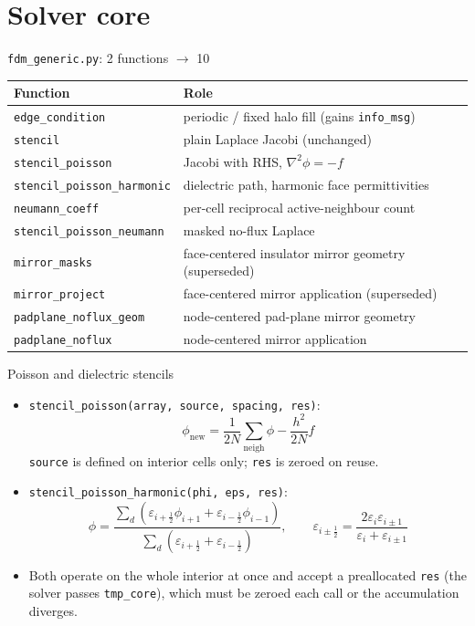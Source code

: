 \documentclass[10pt,aspectratio=169]{beamer}
\newcommand{\ti}[1]{\texttt{\footnotesize #1}}
\begin{document}
\section{Solver core}

\begin{frame}{\texttt{fdm\_generic.py}: 2 functions $\rightarrow$ 10}
  \small
  \begin{center}
  \begin{tabular}{ll}
    \toprule
    Function & Role \\
    \midrule
    \ti{edge\_condition} & periodic / fixed halo fill (gains \ti{info\_msg}) \\
    \ti{stencil} & plain Laplace Jacobi (unchanged) \\
    \ti{stencil\_poisson} & Jacobi with RHS, $\nabla^2\phi=-f$ \\
    \ti{stencil\_poisson\_harmonic} & dielectric path, harmonic face permittivities \\
    \ti{neumann\_coeff} & per-cell reciprocal active-neighbour count \\
    \ti{stencil\_poisson\_neumann} & masked no-flux Laplace \\
    \ti{mirror\_masks} & face-centered insulator mirror geometry (superseded) \\
    \ti{mirror\_project} & face-centered mirror application (superseded) \\
    \ti{padplane\_noflux\_geom} & node-centered pad-plane mirror geometry \\
    \ti{padplane\_noflux} & node-centered mirror application \\
    \bottomrule
  \end{tabular}
  \end{center}
\end{frame}

\begin{frame}{Poisson and dielectric stencils}
  \begin{itemize}\small
  \item \ti{stencil\_poisson(array, source, spacing, res)}:
        \[\phi_{\text{new}}=\frac{1}{2N}\sum_{\text{neigh}}\phi-\frac{h^2}{2N}f\]
        \ti{source} is defined on interior cells only; \ti{res} is zeroed on reuse.
  \item \ti{stencil\_poisson\_harmonic(phi, eps, res)}:
        \[\phi=\frac{\sum_d\left(\varepsilon_{i+\frac12}\phi_{i+1}+\varepsilon_{i-\frac12}\phi_{i-1}\right)}
                     {\sum_d\left(\varepsilon_{i+\frac12}+\varepsilon_{i-\frac12}\right)},
          \qquad
          \varepsilon_{i\pm\frac12}=\frac{2\varepsilon_i\varepsilon_{i\pm1}}{\varepsilon_i+\varepsilon_{i\pm1}}\]
  \item Both operate on the whole interior at once and accept a preallocated \ti{res}
        (the solver passes \ti{tmp\_core}), which must be zeroed each call or the
        accumulation diverges.
  \end{itemize}
\end{frame}
\end{document}
